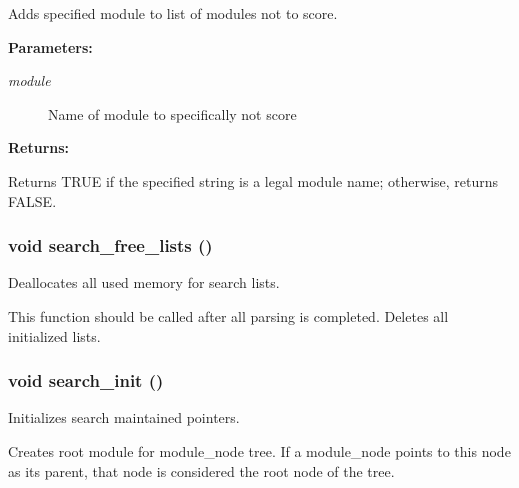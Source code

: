 Adds specified module to list of modules not to score.

\begin{Desc}
\item[{\bf Parameters: }]\par
\begin{description}
\item[
{\em module}]Name of module to specifically not score \end{description}
\end{Desc}
\begin{Desc}
\item[{\bf Returns: }]\par
Returns TRUE if the specified string is a legal module name; otherwise, returns FALSE. \end{Desc}
\subsubsection{\setlength{\rightskip}{0pt plus 5cm}void search\_\-free\_\-lists ()}\label{search_8h_a6}


Deallocates all used memory for search lists.

This function should be called after all parsing is completed.  Deletes all initialized lists. 
\subsubsection{\setlength{\rightskip}{0pt plus 5cm}void search\_\-init ()}\label{search_8h_a0}


Initializes search maintained pointers.

Creates root module for module\_\-node tree. If a module\_\-node points to this node as its parent, that node is considered the root node of the tree. 